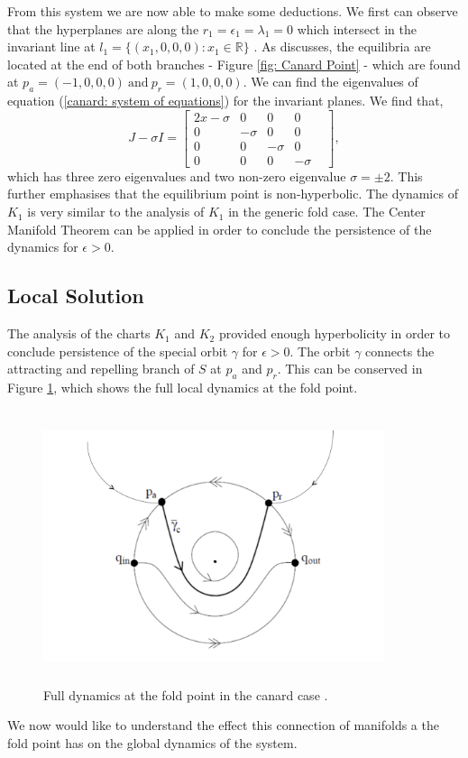 From this system we are now able to make some deductions. We first can observe that the hyperplanes are along the $r_1=\epsilon_1=\lambda_1=0$ which intersect in the invariant line at $l_1=\{(x_1,0,0,0): x_1\in\mathbb{R}\}$ \citep{krupa2001}. As \citet{krupa2001} discusses, the equilibria are located at the end of both branches - Figure \ref{fig: Canard Point} - which are found at $p_a=(-1,0,0,0) \ \text{and} \ p_r=(1,0,0,0)$. We can find the eigenvalues of equation (\ref{canard: system of equations}) for the invariant planes. We find that, 
\begin{equation}
J-\sigma I= \begin{bmatrix}
2x-\sigma & 0 & 0 & 0  \\
0 & -\sigma & 0 & 0&\\
0 & 0 & -\sigma & 0 \\
0 & 0 & 0 & -\sigma
\end{bmatrix},
\end{equation}
which has three zero eigenvalues and two non-zero eigenvalue $\sigma=\pm 2$. This further emphasises that the equilibrium point is non-hyperbolic. 
The dynamics of $K_1$ is very similar to the analysis of $K_1$ in the generic fold case. The Center Manifold Theorem can be applied in order to conclude the persistence of the dynamics for $\epsilon >0$.

\subsection{Local Solution}
The analysis of the charts $K_1$ and $K_2$ provided enough hyperbolicity in order to conclude persistence of the special orbit $\gamma$ for $\epsilon >0$. The orbit $\gamma$ connects the attracting and repelling branch of $S$ at $p_a$ and $p_r$. This can be conserved in Figure \ref{canardsolloc}, which shows the full local dynamics at the fold point.
\begin{figure}[h!]\centering
	\includegraphics[height=8cm,width=10cm]{Images/pres-cancard}
	\caption{Full dynamics at the fold point in the canard case \citep{krupa2001}.}
	\label{canardsolloc}
\end{figure}
We now would like to understand the effect this connection of manifolds a the fold point has on the global dynamics of the system.

